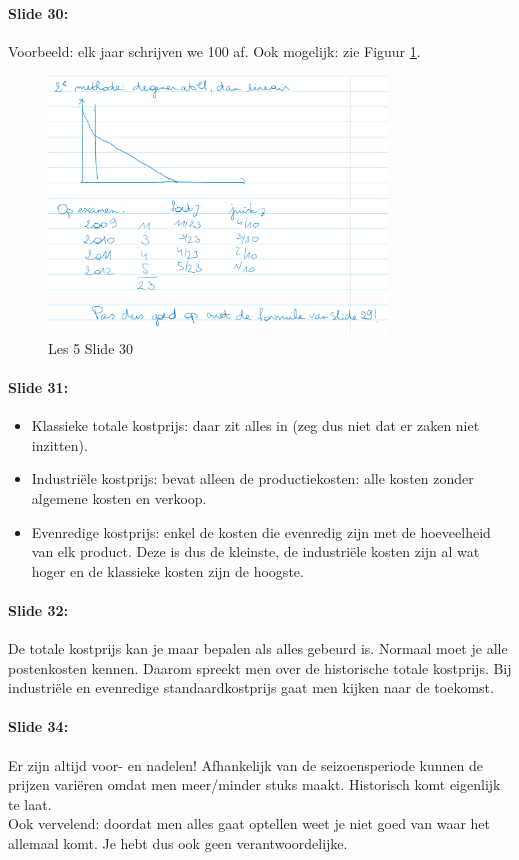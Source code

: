 \documentclass[10pt,a4paper]{report}
\begin{document}
\paragraph{Slide 30:} Voorbeeld: elk jaar schrijven we 100 af. Ook mogelijk: zie Figuur \ref{les05_08}.

\begin{figure}[h!]
\centering
\includegraphics[width=90mm]{Les05_08.png}
\caption{Les 5 Slide 30} 
\label{les05_08}
\end{figure}

\paragraph{Slide 31:}
\begin{itemize}
\item Klassieke totale kostprijs: daar zit alles in (zeg dus niet dat er zaken niet inzitten).
\item Industri\"ele kostprijs: bevat alleen de productiekosten: alle kosten zonder algemene kosten en verkoop.
\item Evenredige kostprijs: enkel de kosten die evenredig zijn met de hoeveelheid van elk product. Deze is dus de kleinste, de industri\"ele kosten zijn al wat hoger en de klassieke kosten zijn de hoogste.
\end{itemize}

\paragraph{Slide 32:} De totale kostprijs kan je maar bepalen als alles gebeurd is. Normaal moet je alle postenkosten kennen. Daarom spreekt men over de historische totale kostprijs. Bij industri\"ele en evenredige standaardkostprijs gaat men kijken naar de toekomst.

\paragraph{Slide 34:} Er zijn altijd voor- en nadelen! Afhankelijk van de seizoensperiode kunnen de prijzen vari\"eren omdat men meer/minder stuks maakt. Historisch komt eigenlijk te laat.\\
Ook vervelend: doordat men alles gaat optellen weet je niet goed van waar het allemaal komt. Je hebt dus ook geen verantwoordelijke.
\end{document}

